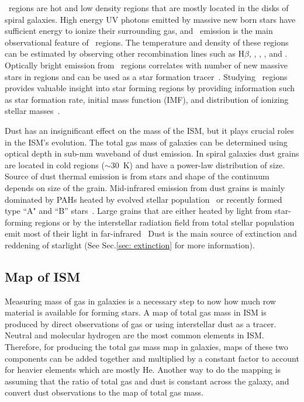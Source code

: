 \hii~regions are hot and low density regions that are mostly located in the disks of spiral galaxies.
High energy UV photons emitted by massive new born stars have sufficient energy to ionize their surrounding gas, and
~\halpha emission is the main observational feature of \hii~regions.
The temperature and density of these regions can be estimated by observing other recombination lines such as H$\beta$, \sii, \oii, \oiii, and \nii. 
Optically bright \halpha emission from \hii~regions correlates with number of new massive stars in regions and can be used as a star formation tracer~\citep[e.g.][]{Kennicutt98b,Calzetti13}. %
Studying \hii~regions provides valuable insight into star forming regions by providing information such as star formation rate, initial mass function (IMF), and distribution of ionizing stellar masses~\citep[][and references therein]{Azimlu11}.

Dust has an insignificant effect on the mass of the ISM, but it plays crucial roles in the ISM's evolution.
The total gas mass of galaxies can be determined using optical depth in sub-mm waveband of dust emission. 
In spiral galaxies dust grains are located in cold regions ($\sim 30$~K) and have a power-law distribution of size.
Source of dust thermal emission is from stars and shape of the continuum depends on size of the grain.
Mid-infrared emission from dust grains is mainly dominated by PAHs heated by evolved stellar population~\cite{Smith07a} or recently formed type ``A" and ``B'' stars~\cite{Peeters04}. %
Large grains that are either heated by light from star-forming regions or by the interstellar radiation field from total stellar population emit most of their light in far-infrared~\citep[e.g.][]{Calapa14, lu14}
Dust is the main source of extinction and reddening of starlight (See Sec.\ref{sec: extinction} for more information).

\subsection{Map of ISM}
\label{sec: ismmap}
Measuring mass of gas in galaxies is a necessary step to now how much row material is available for forming stars.
A map of total gas mass in ISM is produced by direct observations of gas or using interstellar dust as a tracer. 
Neutral and molecular hydrogen are the most common elements in ISM. 
Therefore, for producing the total gas mass map in galaxies, maps of these two components can be added together and multiplied by a constant factor to account for heavier elements which are mostly He. 
Another way to do the mapping is assuming that the ratio of total gas and dust is constant across the galaxy, and convert dust observations to the map of total gas mass.

